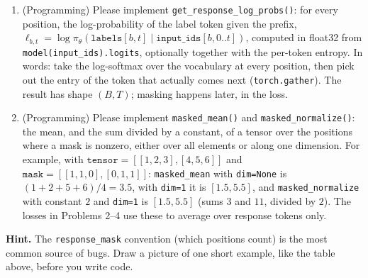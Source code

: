 \documentclass[11pt]{article}
\begin{document}
\begin{enumerate}
        \emph{Numerical stability.} Logits can be large, e.g.\ around $10^3$ in absolute value (the hidden tests
        use such values). Computing $p_v = e^{z_v}/\sum_u e^{z_u}$ directly overflows: $e^{1000}$ is
        \texttt{inf} in floating point, and then $\log 0 = -\infty$ and $0\cdot(-\infty)$ give \texttt{nan}.
        Instead compute $\log p$ with \texttt{torch.log\_softmax} (which subtracts the maximum logit internally
        and never forms $e^{1000}$), then $H = -\sum_v e^{\log p_v}\log p_v$. Your function must return finite
        values for such inputs.
  \item (Programming) Please implement \texttt{get\_response\_log\_probs()}: for every position, the
        log-probability of the label token given the prefix, $\ell_{b,t} = \log \pi_\theta(\texttt{labels}[b,t]
        \mid \texttt{input\_ids}[b, 0..t])$, computed in float32 from \texttt{model(input\_ids).logits},
        optionally together with the per-token entropy. In words: take the log-softmax over the vocabulary at
        every position, then pick out the entry of the token that actually comes next (\texttt{torch.gather}).
        The result has shape $(B, T)$; masking happens later, in the loss.
  \item (Programming) Please implement \texttt{masked\_mean()} and \texttt{masked\_normalize()}: the mean, and
        the sum divided by a constant, of a tensor over the positions where a mask is nonzero, either over all
        elements or along one dimension. For example, with
        $\texttt{tensor} = [[1, 2, 3], [4, 5, 6]]$ and $\texttt{mask} = [[1, 1, 0], [0, 1, 1]]$:
        \texttt{masked\_mean} with \texttt{dim=None} is $(1+2+5+6)/4 = 3.5$, with \texttt{dim=1} it is
        $[1.5, 5.5]$, and \texttt{masked\_normalize} with constant $2$ and \texttt{dim=1} is $[1.5, 5.5]$
        (sums $3$ and $11$, divided by $2$). The losses in Problems 2--4 use these to average over response
        tokens only.
\end{enumerate}
\textbf{Hint.} The \texttt{response\_mask} convention (which positions count) is the most common source of bugs.
Draw a picture of one short example, like the table above, before you write code.

\end{document}
